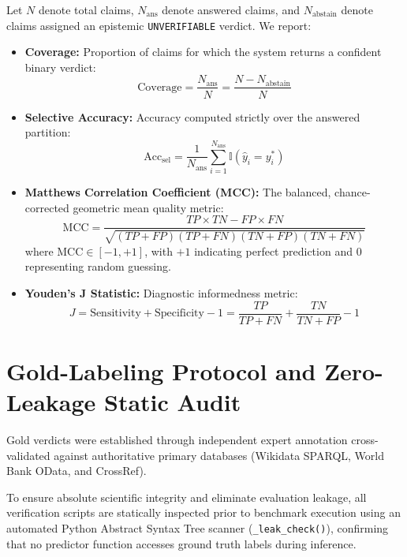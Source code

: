 Let $N$ denote total claims, $N_{\text{ans}}$ denote answered claims, and $N_{\text{abstain}}$ denote claims assigned an epistemic \texttt{UNVERIFIABLE} verdict. We report:
\begin{itemize}
    \item \textbf{Coverage:} Proportion of claims for which the system returns a confident binary verdict:
    \begin{equation}
        \text{Coverage} = \frac{N_{\text{ans}}}{N} = \frac{N - N_{\text{abstain}}}{N}
    \end{equation}
    \item \textbf{Selective Accuracy:} Accuracy computed strictly over the answered partition:
    \begin{equation}
        \text{Acc}_{\text{sel}} = \frac{1}{N_{\text{ans}}} \sum_{i=1}^{N_{\text{ans}}} \mathbb{I}(\hat{y}_i = y_i^*)
    \end{equation}
    \item \textbf{Matthews Correlation Coefficient (MCC):} The balanced, chance-corrected geometric mean quality metric:
    \begin{equation}
        \text{MCC} = \frac{TP \times TN - FP \times FN}{\sqrt{(TP+FP)(TP+FN)(TN+FP)(TN+FN)}}
    \end{equation}
    where $\text{MCC} \in [-1, +1]$, with $+1$ indicating perfect prediction and $0$ representing random guessing.
    \item \textbf{Youden's J Statistic:} Diagnostic informedness metric:
    \begin{equation}
        J = \text{Sensitivity} + \text{Specificity} - 1 = \frac{TP}{TP+FN} + \frac{TN}{TN+FP} - 1
    \end{equation}
\end{itemize}

\section{Gold-Labeling Protocol and Zero-Leakage Static Audit}
\label{sec:labeling_protocol}

Gold verdicts were established through independent expert annotation cross-validated against authoritative primary databases (Wikidata SPARQL, World Bank OData, and CrossRef). 

To ensure absolute scientific integrity and eliminate evaluation leakage, all verification scripts are statically inspected prior to benchmark execution using an automated Python Abstract Syntax Tree scanner (\texttt{\_leak\_check()}), confirming that no predictor function accesses ground truth labels during inference.
